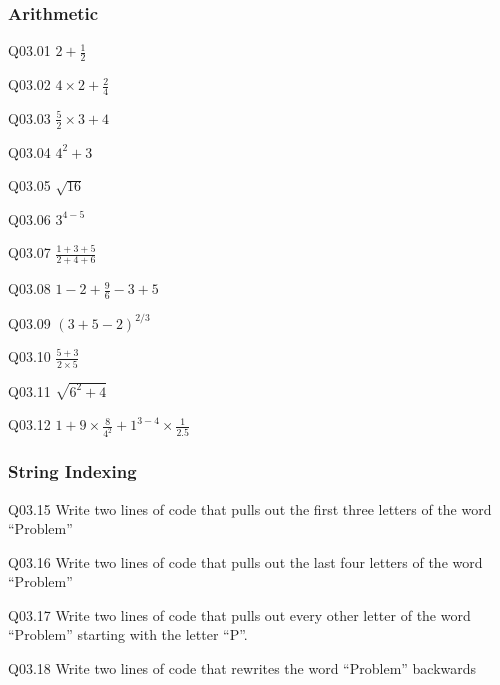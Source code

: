 \documentclass{book}
\newenvironment{problems}{}{}  %
\begin{document}
    
        \begin{problems}
        \hypertarget{arithmetic}{%
\subsubsection{Arithmetic}\label{arithmetic}}

Q03.01 \(2 + \frac{1}{2}\)

Q03.02 \(4 \times 2 + \frac{2}{4}\)

Q03.03 \(\frac{5}{2} \times 3 + 4\)

Q03.04 \(4^2 + 3\)

Q03.05 \(\sqrt{16}\)

Q03.06 \(3^{4-5}\)

Q03.07 \(\frac{1+3+5}{2+4+6}\)

Q03.08 \(1 - 2 + \frac{9}{6} -3 + 5\)

Q03.09 \((3 + 5 -2)^{2/3}\)

Q03.10 \(\frac{5+3}{2 \times 5}\)

Q03.11 \(\sqrt{6^2 + 4}\)

Q03.12 \(1 + 9 \times \frac{8}{4^2} + 1^{3-4} \times \frac{1}{2.5}\)
        \end{problems}

    




    
        \hypertarget{string-indexing}{%
\subsubsection{String Indexing}\label{string-indexing}}

Q03.15 Write two lines of code that pulls out the first three letters of
the word ``Problem''

Q03.16 Write two lines of code that pulls out the last four letters of
the word ``Problem''

Q03.17 Write two lines of code that pulls out every other letter of the
word ``Problem'' starting with the letter ``P''.

Q03.18 Write two lines of code that rewrites the word ``Problem''
backwards
    
\end{document}
